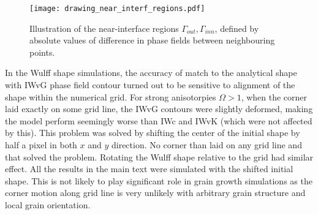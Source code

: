 	\begin{figure}[]
		\centering
		\texttt{[image: drawing\_near\_interf\_regions.pdf]}
		\caption{Illustration of the near-interface regions $\Gamma_{out},\Gamma_{inn}$, defined by absolute values of difference in phase fields between neighbouring points.}
		\label{fig_sketch_near_interf_regions}
	\end{figure}
	
	In the Wulff shape simulations, the accuracy of match to the analytical shape with IWvG phase field contour turned out to be sensitive to alignment of the shape within the numerical grid. For strong anisotorpies $\Omega>1$, when the corner laid exactly on some grid line, the IWvG contours were slightly deformed, making the model perform seemingly worse than IWc and IWvK (which were not affected by this). This problem was solved by shifting the center of the initial shape by half a pixel in both $x$ and $y$ direction. No corner than laid on any grid line and that solved the problem. Rotating the Wulff shape relative to the grid had similar effect. All the results in the main text were simulated with the shifted initial shape. This is not likely to play significant role in grain growth simulations as the corner motion along grid line is very unlikely with arbitrary grain structure and local grain orientation.
	
\cleardoublepage

